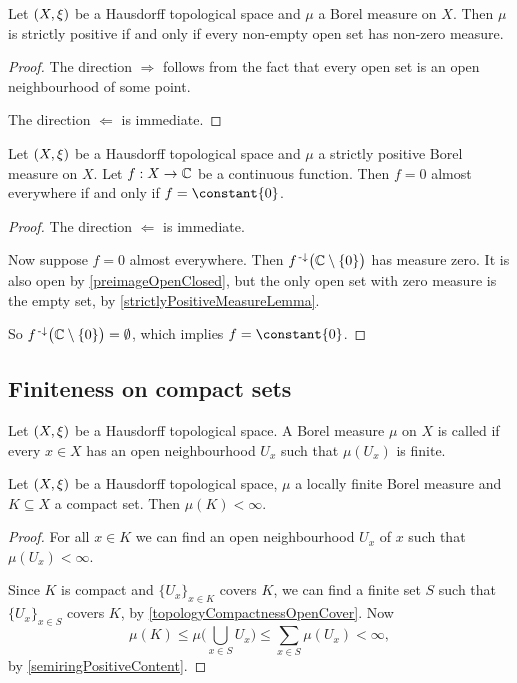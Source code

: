 \begin{lemma} \label{strictlyPositiveMeasureLemma}
Let $\sSet{X, \xi}$ be a Hausdorff topological space and $\mu$ a Borel measure on $X$. Then $\mu$ is strictly positive \textup{if and only if} every non-empty open set has non-zero measure.
\end{lemma}
\begin{proof}
The direction $\Rightarrow$ follows from the fact that every open set is an open neighbourhood of some point.

The direction $\Leftarrow$ is immediate.
\end{proof}

\begin{proposition} \label{continuousZeroAEImpliesConstant}
Let $\sSet{X, \xi}$ be a Hausdorff topological space and $\mu$ a strictly positive Borel measure on $X$. Let $f: X\to \mathbb{C}$ be a continuous function. Then $f= 0$ almost everywhere \textup{if and only if} $f = \constant{0}$. 
\end{proposition}
\begin{proof}
The direction $\Leftarrow$ is immediate.

Now suppose $f = 0$ almost everywhere. Then $f^{\text{\hspace{0.15em}-}\downarrow}\big(\mathbb{C}\setminus \{0\}\big)$ has measure zero. It is also open by \ref{preimageOpenClosed}, but the only open set with zero measure is the empty set, by \ref{strictlyPositiveMeasureLemma}.

So $f^{\text{\hspace{0.15em}-}\downarrow}\big(\mathbb{C}\setminus \{0\}\big) = \emptyset$, which implies $f = \constant{0}$.
\end{proof}

\subsection{Finiteness on compact sets}
\begin{definition}
Let $\sSet{X, \xi}$ be a Hausdorff topological space. A Borel measure $\mu$ on $X$ is called  if every $x\in X$ has an open neighbourhood $U_x$ such that $\mu(U_x)$ is finite.
\end{definition}

\begin{lemma}
Let $\sSet{X, \xi}$ be a Hausdorff topological space, $\mu$ a locally finite Borel measure and $K\subseteq X$ a compact set. Then $\mu(K) < \infty$.
\end{lemma}
\begin{proof}
For all $x\in K$ we can find an open neighbourhood $U_x$ of $x$ such that $\mu(U_x) < \infty$.

Since $K$ is compact and $\{U_x\}_{x\in K}$ covers $K$, we can find a finite set $S$ such that $\{U_x\}_{x\in S}$ covers $K$, by \ref{topologyCompactnessOpenCover}. Now
\[ \mu(K) \leq \mu\Big(\bigcup_{x\in S}U_x\Big) \leq \sum_{x\in S}\mu(U_x) < \infty, \]
by \ref{semiringPositiveContent}.
\end{proof}

